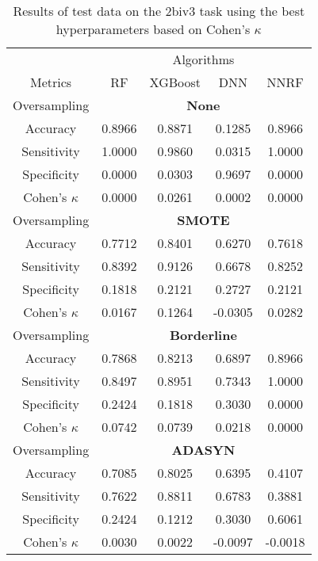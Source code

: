 \begin{table}[!htb]
\centering
\caption{Results of test data on the 2biv3 task using the best hyperparameters based on Cohen's $\kappa$}
\label{tab:2biv3_test_results}
\begin{tabular}{c | c c c c}
\hline
 & \multicolumn{4}{c}{Algorithms}\\ 
Metrics &RF & XGBoost & DNN & NNRF\\ 
\hline
Oversampling &\multicolumn{4}{|c}{\textbf{None}}\\ 
\hline
Accuracy & 0.8966 & 0.8871 & 0.1285 & 0.8966\\ 
Sensitivity & 1.0000 & 0.9860 & 0.0315 & 1.0000\\ 
Specificity & 0.0000 & 0.0303 & 0.9697 & 0.0000\\ 
Cohen's $\kappa$ & 0.0000 & 0.0261 & 0.0002 & 0.0000\\ 
\hline
Oversampling &\multicolumn{4}{|c}{\textbf{SMOTE}}\\ 
\hline
Accuracy & 0.7712 & 0.8401 & 0.6270 & 0.7618\\ 
Sensitivity & 0.8392 & 0.9126 & 0.6678 & 0.8252\\ 
Specificity & 0.1818 & 0.2121 & 0.2727 & 0.2121\\ 
Cohen's $\kappa$ & 0.0167 & 0.1264 & -0.0305 & 0.0282\\ 
\hline
Oversampling &\multicolumn{4}{|c}{\textbf{Borderline}}\\ 
\hline
Accuracy & 0.7868 & 0.8213 & 0.6897 & 0.8966\\ 
Sensitivity & 0.8497 & 0.8951 & 0.7343 & 1.0000\\ 
Specificity & 0.2424 & 0.1818 & 0.3030 & 0.0000\\ 
Cohen's $\kappa$ & 0.0742 & 0.0739 & 0.0218 & 0.0000\\ 
\hline
Oversampling &\multicolumn{4}{|c}{\textbf{ADASYN}}\\ 
\hline
Accuracy & 0.7085 & 0.8025 & 0.6395 & 0.4107\\ 
Sensitivity & 0.7622 & 0.8811 & 0.6783 & 0.3881\\ 
Specificity & 0.2424 & 0.1212 & 0.3030 & 0.6061\\ 
Cohen's $\kappa$ & 0.0030 & 0.0022 & -0.0097 & -0.0018\\ 
\hline
\end{tabular}
\end{table}


